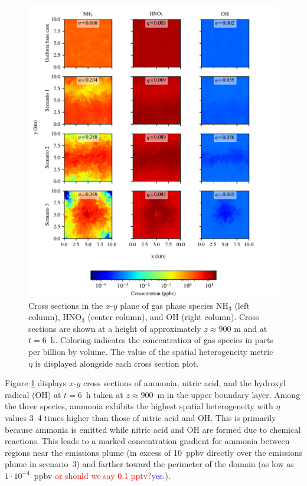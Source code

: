 \documentclass[journal abbreviation, manuscript]{copernicus}
\begin{document}
\begin{figure}[!h]
	\centering
	\includegraphics[]{figures/gas-spatial-heterogeneity-time36-z45.pdf}
	\caption{Cross sections in the $x$-$y$ plane of gas phase
          species NH$_3$ (left column), HNO$_3$ (center column), and
          OH (right column). Cross sections are shown at a height of
          approximately $z\approx900$ m and at $t=6$~h. Coloring
          indicates the concentration of gas species in parts per
          billion by volume. The value of the spatial heterogeneity
          metric $\eta$ is displayed alongside each cross section
          plot.}
	\label{fig:gas-cross-sec}
\end{figure} 

Figure \ref{fig:gas-cross-sec} displays $x$-$y$ cross sections of
ammonia, nitric acid, and the hydroxyl radical (OH) at $t=6$~h taken
at $z\approx900$~m in the upper boundary layer. Among the three
species, ammonia exhibits the highest spatial heterogeneity with
$\eta$ values 3--4 times higher than those of nitric acid and OH. This
is primarily because ammonia is emitted while nitric acid and OH are
formed due to chemical reactions. This leads to a marked concentration
gradient for ammonia between regions near the emissions plume (in
excess of 10~ppbv directly over the emissions plume in scenario~3) and
farther toward the perimeter of the domain (as low as
$1\cdot10^{-4}$~ppbv \textcolor{red}{or should we say 0.1
  pptv?}\textcolor{blue}{yes.}).
\end{document}
